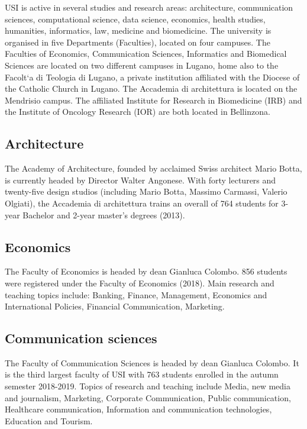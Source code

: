 \documentclass[letterpaper,11pt]{article}
\begin{document}
\begin{multicols}{2}
USI is active in several studies and research areas: architecture, communication sciences, computational science, data science, economics, health studies, humanities, informatics, law, medicine and biomedicine.
The university is organised in five Departments (Faculties), located on four campuses.
The Faculties of Economics, Communication Sciences, Informatics and Biomedical Sciences are located on two different campuses in Lugano, home also to the Facolt`a di Teologia di Lugano, a private institution affiliated with the Diocese of the Catholic Church in Lugano.
The Accademia di architettura is located on the Mendrisio campus. The affiliated Institute for Research in Biomedicine (IRB) and the Institute of Oncology Research (IOR) are both located in Bellinzona.

\subsection{Architecture}
The Academy of Architecture, founded by acclaimed Swiss architect Mario Botta, is currently headed by Director Walter Angonese.
With forty lecturers and twenty-five design studios (including Mario Botta, Massimo Carmassi, Valerio Olgiati), the Accademia di architettura trains an overall of 764 students for 3-year Bachelor and 2-year master’s degrees (2013).

\subsection{Economics}
The Faculty of Economics is headed by dean Gianluca Colombo.
856 students were registered under the Faculty of Economics (2018).
Main research and teaching topics include: Banking, Finance, Management, Economics and International Policies, Financial Communication, Marketing.

\subsection{Communication sciences}
The Faculty of Communication Sciences is headed by dean Gianluca Colombo.
It is the third largest faculty of USI with 763 students enrolled in the autumn semester 2018-2019.
Topics of research and teaching include Media, new media and journalism, Marketing, Corporate Communication, Public communication, Healthcare communication, Information and communication technologies, Education and Tourism.


\end{multicols}
\end{document}
